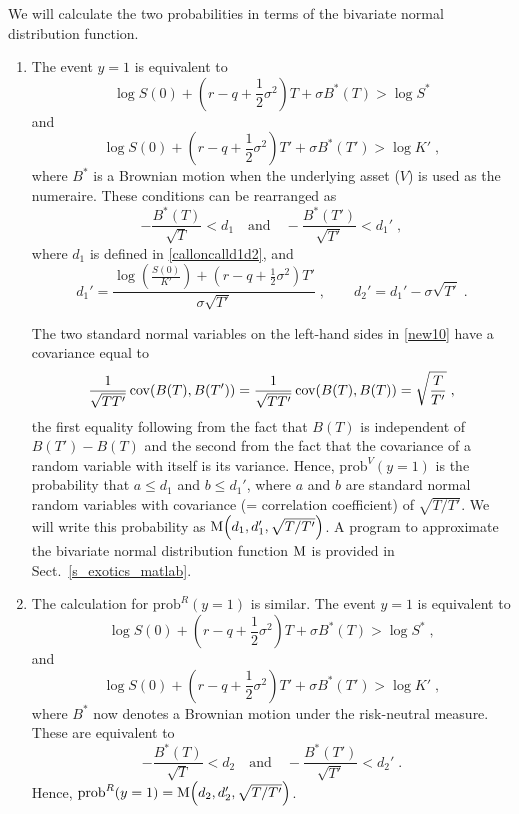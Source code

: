 We will calculate the two probabilities in terms of the bivariate normal distribution function.  
\begin{enumerate}
\item The event $y=1$ is equivalent to
$$\log S(0) + \left(r-q+\frac{1}{2}\sigma^2\right)T+\sigma B^*(T) > \log S^*$$
and
$$\log S(0) + \left(r-q+\frac{1}{2}\sigma^2\right)T'+\sigma B^*(T') > \log K'\; ,$$
where $B^*$ is a Brownian motion when the underlying asset ($V$) is used as the numeraire. These conditions can be rearranged as
\begin{equation}\label{new10}
- \frac{B^*(T)}{\sqrt{T}} < d_1 \quad \text{and} \quad - \frac{B^*(T')}{\sqrt{T'}} < d_1'\;,
\end{equation}
where $d_1$ is defined in \eqref{calloncalld1d2}, and
\begin{equation}\label{callcallds}
d_1' = \frac{\log\left(\frac{S(0)}{K'}\right)+\left(r-q+\frac{1}{2}\sigma^2\right)T'}{\sigma\sqrt{T'}}\;,
 \qquad d_2'=d_1'-\sigma\sqrt{T'}\;.
\end{equation}


The two standard normal variables on the left-hand sides in \eqref{new10} have a covariance equal to
$$\frac{1}{\sqrt{TT'}}\operatorname{cov}(B(T),B(T')) = \frac{1}{\sqrt{TT'}}\operatorname{cov}(B(T),B(T)) = \sqrt{\frac{T}{T'}}\; ,$$
the first equality following from the fact that $B(T)$ is independent of $B(T')-B(T)$ and the second from the fact that the covariance of a random variable with itself is its variance.
Hence, $\text{prob}^V\!(y=1)$ is the probability that $a\leq d_1$ and $b\leq d_1'$, where $a$ and $b$ are standard normal random variables with covariance (= correlation coefficient) of $\sqrt{T/T'}$.  We will write this probability as $\operatorname{M}\!\left(d_1,d_1',\sqrt{T/T'}\right)$.  A program to approximate the bivariate normal  distribution function $\operatorname{M}$ is provided in Sect.~\ref{s_exotics_matlab}.

\item The calculation for $\text{prob}^R(y=1)$ is similar.  The event $y=1$
is equivalent to
$$\log S(0) + \left(r-q+\frac{1}{2}\sigma^2\right)T+\sigma B^*(T) > \log S^*\;,$$
and
$$\log S(0) + \left(r-q+\frac{1}{2}\sigma^2\right)T'+\sigma B^*(T') > \log K'\; ,$$
where $B^*$ now denotes a Brownian motion under the risk-neutral measure.  These are equivalent to
\begin{equation}\label{new11000}
- \frac{B^*(T)}{\sqrt{T}} < d_2 \quad \text{and} \quad - \frac{B^*(T')}{\sqrt{T'}} < d_2'\;.
\end{equation}
Hence, $\text{prob}^R(y=1)=\operatorname{M}\!\left(d_2,d_2',\sqrt{T/T'}\right)$.  
\end{enumerate}
